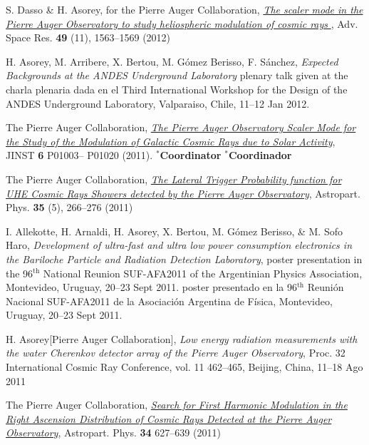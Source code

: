 \begin{etaremune}
\item {}S. Dasso \& H. Asorey, for the Pierre Auger Collaboration,
\href{http://dx.doi.org/10.1016/j.asr.2011.12.028}{\emph{ The scaler mode in
the Pierre Auger Observatory to study heliospheric modulation of cosmic rays
}}, Adv. Space Res. {\bf{49}} (11), 1563--1569 (2012)

\item {} H. Asorey, M. Arribere, X. Bertou, M. Gómez Berisso, F. Sánchez,
{\emph{Expected Backgrounds at the ANDES Underground Laboratory}}
\ifeng
plenary talk given at the
\else 
charla plenaria dada en el
\fi
Third International Workshop for the Design of the ANDES Underground Laboratory, Valparaiso, Chile, 11--12 Jan 2012.

\item {}The Pierre Auger Collaboration,
\href{http://dx.doi.org/10.1088/1748-0221/6/01/P01003}{\emph{The Pierre Auger
Observatory Scaler Mode for the Study of the Modulation of Galactic Cosmic Rays
due to Solar Activity}}, JINST {\bf 6} P01003--
P01020 (2011).
\ifeng $^*${\bf{Coordinator}} \else $^*${\bf{Coordinador}} \fi

\item {} The Pierre Auger Collaboration, 
\href{http://dx.doi.org/10.1016/j.astropartphys.2011.08.001}{\emph{The Lateral
Trigger Probability function for UHE Cosmic Rays Showers detected by the Pierre
Auger Observatory}}, Astropart. Phys. {\bf{35}} (5), 266--276 (2011)

\item {}I. Allekotte, H. Arnaldi, H. Asorey, X. Bertou, M. Gómez Berisso, \& M. Sofo Haro, {\emph{Development of ultra-fast and ultra low power consumption electronics in the Bariloche Particle and Radiation Detection Laboratory}},
\ifeng
poster presentation in the 96$^{\mathrm{th}}$ National Reunion SUF-AFA2011 of the Argentinian Physics Association, Montevideo, Uruguay, 20--23 Sept 2011.
\else
poster presentado en la 96$^{\mathrm{th}}$ Reunión Nacional SUF-AFA2011 de la Asociación Argentina de Física, Montevideo, Uruguay, 20--23 Sept 2011.
\fi

\item {}H. Asorey[Pierre Auger Collaboration], {\emph{Low energy radiation
measurements with the water Cherenkov detector array of the Pierre Auger
Observatory}}, \en Proc. 32 International Cosmic Ray Conference, vol. 11
462--465, Beijing, China, 11--18 Ago 2011

\item {}The Pierre Auger Collaboration,
\href{http://dx.doi.org/10.1016/j.astropartphys.2010.12.007}{\emph{Search for
First Harmonic Modulation in the Right Ascension Distribution of Cosmic Rays
Detected at the Pierre Auger Observatory}}, Astropart. Phys. {\bf 34} 627--639
(2011)


\end{etaremune}
